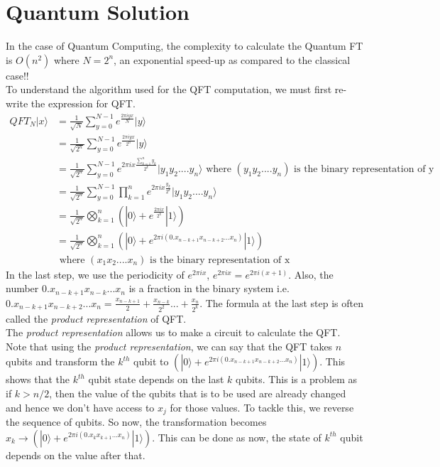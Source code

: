 \section{Quantum Solution}
In the case of Quantum Computing, the complexity to calculate the Quantum FT is $O(n^2)$ where $N = 2^n$, an exponential speed-up as compared to the classical case!! \\
To understand the algorithm used for the QFT computation, we must first re-write the expression for QFT.
\begin{equation}
\begin{split}
QFT_N|x\rangle &= \frac{1}{\sqrt{N}} \sum_{y=0}^{N-1} e^{\frac{2\pi iyx}{N}} |y\rangle
\\ &= \frac{1}{\sqrt{2^n}} \sum_{y=0}^{N-1} e^{\frac{2\pi iyx}{2^n}} |y\rangle
\\ &= \frac{1}{\sqrt{2^n}} \sum_{y=0}^{N-1} e^{2\pi ix\frac{\sum_{k=1}^{n}y_k}{2^k}} |y_1y_2....y_n\rangle \text{ where $(y_1y_2....y_n)$ is the binary representation of y}
\\ &= \frac{1}{\sqrt{2^n}} \sum_{y=0}^{N-1} \prod_{k=1}^{n} e^{2\pi ix\frac{y_k}{2^k}} |y_1y_2....y_n\rangle 
\\ &= \frac{1}{\sqrt{2^n}} \bigotimes_{k=1}^n \left( |0\rangle + e^{\frac{2\pi ix}{2^k}} |1\rangle \right)
\\& = \frac{1}{\sqrt{2^n}} \bigotimes_{k=1}^n \left( |0\rangle + e^{2\pi i (0.x_{n-k+1}x_{n-k+2}...x_n)} |1\rangle \right)\\& \text{ where $(x_1x_2....x_n)$ is the binary representation of x}
\end{split}
\end{equation}
In the last step, we use the periodicity of $e^{2\pi ix} $, $e^{2\pi i x} = e^{2\pi i (x+1)}$. Also, the number $0.x_{n-k+1}x_{n-k}...x_n$ is a fraction in the binary system i.e. $0.x_{n-k+1}x_{n-k+2}...x_n = \frac{x_{n-k+1}}{2} + \frac{x_{n-k}}{2^2} ... + \frac{x_{n}}{2^k}$. The formula at the last step is often called the \textit{product representation} of QFT.\\
The \textit{product representation} allows us to make a circuit to calculate the QFT. Note that using the \textit{product representation}, we can say that the QFT takes $n$ qubits and transform the $k^{th}$ qubit to $\left( |0\rangle + e^{2\pi i (0.x_{n-k+1}x_{n-k+2}...x_n)} |1\rangle \right)$. This shows that the $k^{th}$ qubit state depends on the last $k$ qubits. This is a problem as if $k > n/2$, then the value of the qubits that is to be used are already changed and hence we don't have access to $x_j$ for those values. To tackle this, we reverse the sequence of qubits. So now, the transformation becomes $x_k \rightarrow \left( |0\rangle + e^{2\pi i (0.x_{k}x_{k+1}...x_n)} |1\rangle \right)$. This can be done as now, the state of $k^{th}$ qubit depends on the value after that. \\
